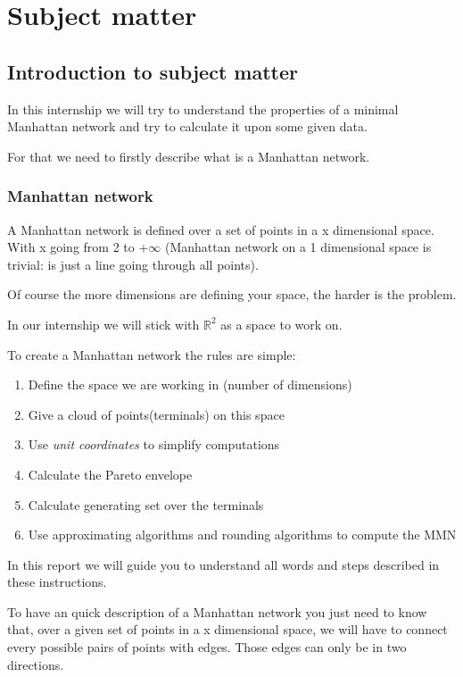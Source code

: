 \chapter{Subject matter}
\section{Introduction to subject matter}%
In this internship we will try to understand the properties of a minimal Manhattan network and try to calculate it upon some given data.

\noindent For that we need to firstly describe what is a Manhattan network.
\subsection{Manhattan network}
A Manhattan network is defined over a set of points in a x dimensional space. With x going from 2 to +$\infty$ (Manhattan network on a 1 dimensional space is trivial: is just a line going through all points).

 Of course the more dimensions are defining your space, the harder is the problem.

In our internship we will stick with $\mathbb{R}^2$ as a space to work on.\newline

\noindent To create a Manhattan network the rules are simple:
\begin{enumerate}
	\item{Define the space we are working in (number of dimensions)}
	\item{Give a cloud of points(terminals) on this space}
	\item{Use \emph{unit coordinates} to simplify computations}
	\item{Calculate the Pareto envelope}
	\item{Calculate generating set over the terminals}
	\item{Use approximating algorithms and rounding algorithms to compute the MMN}
\end{enumerate}
	In this report we will guide you to understand all words and steps described in these instructions. 
	
	To have an quick description of a Manhattan network you just need to know that, over a given set of points in a x dimensional space, we will have to connect every possible pairs of points with edges. Those edges can only be in two directions. 
	
